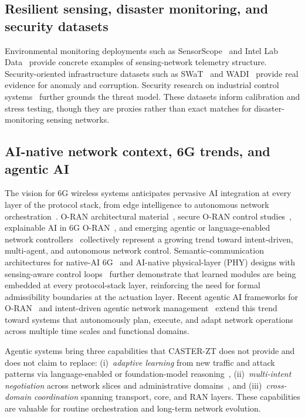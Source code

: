 \documentclass[10pt,journal,compsoc]{IEEEtran}
\begin{document}
\subsection{Resilient sensing, disaster monitoring, and security datasets}
Environmental monitoring deployments such as SensorScope~\cite{sensorscope2008} and Intel Lab Data~\cite{intel_lab_data_2004} provide concrete examples of sensing-network telemetry structure.
Security-oriented infrastructure datasets such as SWaT~\cite{goh2017swat} and WADI~\cite{wadi2018} provide real evidence for anomaly and corruption.
Security research on industrial control systems~\cite{cardenas2011attacks} further grounds the threat model.
These datasets inform calibration and stress testing, though they are proxies rather than exact matches for disaster-monitoring sensing networks.

\subsection{AI-native network context, 6G trends, and agentic AI}
The vision for 6G wireless systems anticipates pervasive AI integration at every layer of the protocol stack, from edge intelligence to autonomous network orchestration~\cite{saad2020vision6g,letaief2019roadmap6g}.
O-RAN architectural material~\cite{oran_official_architecture,polese2023oran}, secure O-RAN control studies~\cite{thimmaraju2024rica1}, explainable AI in 6G O-RAN~\cite{xai_oran_2023}, and emerging agentic or language-enabled network controllers~\cite{toward_autonomous_oran_2026,demirel2026agentic,lee2024llmran} collectively represent a growing trend toward intent-driven, multi-agent, and autonomous network control.
Semantic-communication architectures for native-AI 6G~\cite{liu2025nativeai6g} and AI-native physical-layer (PHY) designs with sensing-aware control loops~\cite{abousab2025ainativephy} further demonstrate that learned modules are being embedded at every protocol-stack layer, reinforcing the need for formal admissibility boundaries at the actuation layer.
Recent agentic AI frameworks for O-RAN~\cite{toward_autonomous_oran_2026} and intent-driven agentic network management~\cite{demirel2026agentic} extend this trend toward systems that autonomously plan, execute, and adapt network operations across multiple time scales and functional domains.

Agentic systems bring three capabilities that CASTER-ZT does not provide and does not claim to replace: (i)~\emph{adaptive learning} from new traffic and attack patterns via language-enabled or foundation-model reasoning~\cite{toward_autonomous_oran_2026,lee2024llmran}, (ii)~\emph{multi-intent negotiation} across network slices and administrative domains~\cite{demirel2026agentic}, and (iii)~\emph{cross-domain coordination} spanning transport, core, and RAN layers.
These capabilities are valuable for routine orchestration and long-term network evolution.
\end{document}
